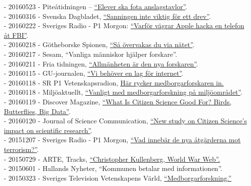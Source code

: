 \documentclass[a4paper,11pt,oneside]{article}
\begin{document}
    - 20160523 - Piteåtidningen – \href{http://www.pt.se/nyheter/pitea/elever-ska-fota-anslagstavlor-10045575.aspx}{``Elever ska fota anslagstavlor''}. \\
    - 20160316 - Svenska Dagbladet, \href{http://www.svd.se/sanning-inte-viktigt-for-ett-drev/om/natdrev}{``Sanningen inte viktig för ett drev''}. \\
    - 20160222 - Sveriges Radio - P1 Morgon: \href{http://t.sr.se/1KBHSak}{``Varför vägrar Apple hacka en telefon åt FBI''}. \\
    - 20160218 - Götheborske Spionen, \href{http://www.spionen.se/140-redaktionellt/reportage/feature/1593-sa-oevervakas-du-via-naetet}{``Så övervakas du via nätet''}. \\
    - 20160217 - Sesam, ``Vanliga människor hjälper forskare''.\\
    - 20160211 - Fria tidningen, \href{http://www.fria.nu/artikel/121724}{``Allmänheten är den nya forskaren''}. \\
    - 20160115 - GU-journalen, \href{https://issuu.com/universityofgothenburg/docs/guj1-2016/32}{``Vi behöver en lag för internet''}. \\
    - 20160118 - SR P1 Vetenskapsradion, \href{http://t.sr.se/239vggG}{Här rycker medborgarforskaren in.}\\
    - 20160118 - Miljöaktuellt, \href{http://miljoaktuellt.se/vanligare-att-forskare-tar-hjalp-av-allmanheten/}{``Vanligt med medborgarforskning på miljöområdet''}. \\
    - 20160119 - Discover Magazine, \href{http://blogs.discovermagazine.com/inkfish/2016/01/19/what-is-citizen-science-good-for-birds-butterflies-big-data/#.Vp9DvPGFB24}{``What Is Citizen Science Good For? Birds, Butterflies, Big Data''}. \\
    - 20160120 - Journal of Science Communication, \href{http://jcom.sissa.it/node/3076}{``New study on Citizen Science’s impact on scientific research''}. \\
    - 20151207 - Sveriges Radio - P1 Morgon, \href{http://t.sr.se/1XMYemi}{``Vad innebär de nya åtgärderna mot terrorism?''}. \\
    - 20150729 - ARTE, Tracks, \href{http://tracks.arte.tv/fr/christopher-kullenberg-world-war-web}{``Christopher Kullenberg, World War Web''.} \\
    - 20150601 - Hallands Nyheter, ``Kommunen betalar med informationen''.\\
    - 20150323 - Sveriges Television Vetenskapens Värld, \href{https://youtu.be/vG8sZQnU7mU?t=18m1s}{``Medborgarforskning.''} \\
\end{document}
